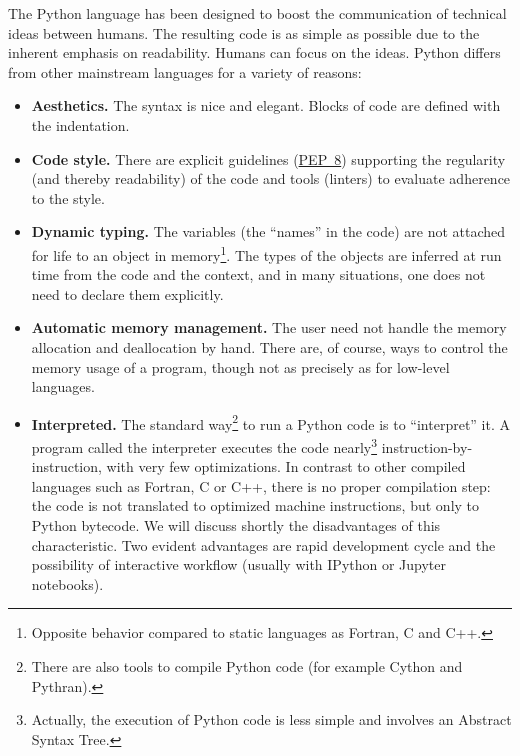 The Python language has been designed to boost the communication of technical
ideas between humans. The resulting code is as simple as possible due to the
inherent emphasis on readability. Humans can focus on the ideas. Python differs
from other mainstream languages for a variety of reasons:

\begin{itemize}
\item \textbf{Aesthetics.} The syntax is nice and elegant. Blocks of code are
defined with the indentation.
\item \textbf{Code style.} There are explicit guidelines
(\href{https://www.python.org/dev/peps/pep-0008/}{PEP~8}) supporting the
regularity (and thereby readability) of the code and tools
(linters) to evaluate adherence to the style.
\item \textbf{Dynamic typing.} The variables (the ``names'' in the code) are
not attached for life to an object in memory\footnote{Opposite behavior
compared to static languages as Fortran, C and C++.}. The types of the objects
are inferred at run time from the code and the context, and in many situations,
one does not need to declare them explicitly.
%
%
\item \textbf{Automatic memory management.}  The user need not handle the
memory allocation and deallocation by hand.  There are, of course, ways to
control the memory usage of a program, though not as precisely as for low-level
languages.
\item \textbf{Interpreted.} The standard way\footnote{There are also tools to
compile Python code (for example Cython and Pythran).} to run a Python code is
to ``interpret'' it.  A program called the interpreter executes the code
nearly\footnote{Actually, the execution of Python code is less simple and
involves an Abstract Syntax Tree.}  instruction-by-instruction, with very few
optimizations.
%
In contrast to other compiled languages such as Fortran, C or C++, there is no
proper compilation step: the code is not translated to optimized machine
instructions, but only to Python bytecode.
%
We will discuss shortly the disadvantages of this characteristic. Two evident
advantages are rapid development cycle and the possibility of interactive
workflow (usually with IPython or Jupyter notebooks).


\end{itemize}
